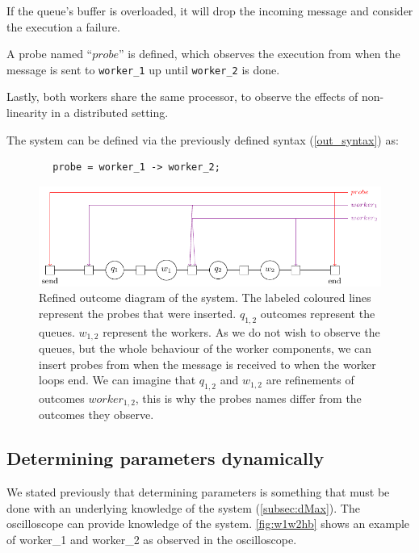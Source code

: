     If the queue's buffer is overloaded, it will drop the incoming message and consider the execution a failure.
    
    A probe named ``$probe$'' is defined, which observes the execution from when the message is sent to \texttt{worker\_1} up until \texttt{worker\_2} is done.

    Lastly, both workers share the same processor, to observe the effects of non-linearity in a distributed setting.

    The system can be defined via the previously defined syntax (\cref{out_syntax}) as: 
    
    \begin{verbatim}
        probe = worker_1 -> worker_2;
    \end{verbatim}

    \begin{figure}[H]
        \begin{center}
            \includegraphics[scale=1]{tikz/mm1k.pdf} 
        \end{center}
        \caption{Refined outcome diagram of the system. The labeled coloured lines represent the probes that were inserted. $q_{1, 2}$ outcomes represent the queues. $w_{1,2}$ represent the workers. As we do not wish to observe the queues, but the whole behaviour of the worker components, we can insert probes from when the message is received to when the worker loops end. We can imagine that $q_{1,2}$ and $w_{1,2}$ are refinements of outcomes $worker_{1,2}$, this is why the probes names differ from the outcomes they observe.}
        \label{fig:mm1k}
    \end{figure}

    \subsection{Determining parameters dynamically}
        We stated previously that determining parameters is something that must be done with an underlying knowledge of the system (\cref{subsec:dMax}). The oscilloscope can provide knowledge of the system. \cref{fig:w1w2hb} shows an example of worker\_1 and worker\_2 as observed in the oscilloscope.

